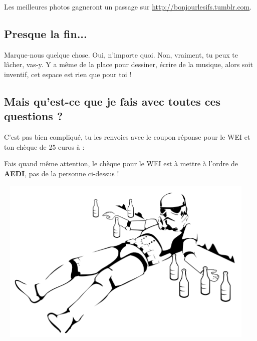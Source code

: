 Les meilleures photos gagneront un passage sur
\url{http://bonjourlesifs.tumblr.com}.

\subsection*{Presque la fin...}
Marque-nous quelque chose. Oui, n'importe quoi. Non, vraiment, tu peux te
lâcher, vas-y. Y a même de la place pour dessiner, écrire de la musique, alors soit inventif, cet
espace est rien que pour toi !
\newpage
\subsection{Mais qu'est-ce que je fais avec toutes ces questions ?}
C'est pas bien compliqué, tu les renvoies avec le coupon réponse pour le WEI et
ton chèque de 25 euros à :
\vspace{1em}
\adresseCoupon
\vspace{1em}


Fais quand même attention, le chèque pour le WEI est à mettre à l'ordre de \textbf{AEDI}, pas de la personne ci-dessus !

\vfill
\columnbreak
~
\vfill
\hspace{-5cm}
\includegraphics[height=8cm]{images/stormTrooperBourre.png}
